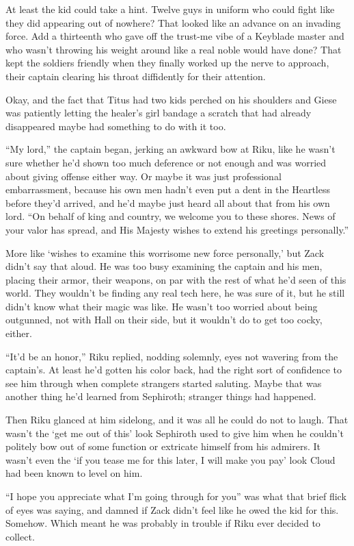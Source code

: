 At least the kid could take a hint. Twelve guys in uniform who could fight like they did appearing out of nowhere? That looked like an advance on an invading force. Add a thirteenth who gave off the trust-me vibe of a Keyblade master and who wasn't throwing his weight around like a real noble would have done? That kept the soldiers friendly when they finally worked up the nerve to approach, their captain clearing his throat diffidently for their attention.

Okay, and the fact that Titus had two kids perched on his shoulders and Giese was patiently letting the healer's girl bandage a scratch that had already disappeared maybe had something to do with it too.

``My lord,'' the captain began, jerking an awkward bow at Riku, like he wasn't sure whether he'd shown too much deference or not enough and was worried about giving offense either way. Or maybe it was just professional embarrassment, because his own men hadn't even put a dent in the Heartless before they'd arrived, and he'd maybe just heard all about that from his own lord. ``On behalf of king and country, we welcome you to these shores. News of your valor has spread, and His Majesty wishes to extend his greetings personally.''

More like `wishes to examine this worrisome new force personally,' but Zack didn't say that aloud. He was too busy examining the captain and his men, placing their armor, their weapons, on par with the rest of what he'd seen of this world. They wouldn't be finding any real tech here, he was sure of it, but he still didn't know what their magic was like. He wasn't too worried about being outgunned, not with Hall on their side, but it wouldn't do to get too cocky, either.

``It'd be an honor,'' Riku replied, nodding solemnly, eyes not wavering from the captain's. At least he'd gotten his color back, had the right sort of confidence to see him through when complete strangers started saluting. Maybe that was another thing he'd learned from Sephiroth; stranger things had happened.

Then Riku glanced at him sidelong, and it was all he could do not to laugh. That wasn't the `get me out of this' look Sephiroth used to give him when he couldn't politely bow out of some function or extricate himself from his admirers. It wasn't even the `if you tease me for this later, I will make you pay' look Cloud had been known to level on him.

``I hope you appreciate what I'm going through for you'' was what that brief flick of eyes was saying, and damned if Zack didn't feel like he owed the kid for this. Somehow. Which meant he was probably in trouble if Riku ever decided to collect.

